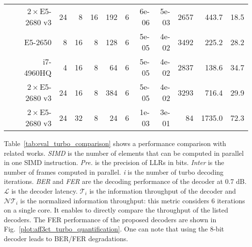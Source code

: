 \begin{table}[htp]
{{\begin{tabular}{r r r r r r r r r r r r}
  \cite{Cassagne2016a}              & $2\times$E5-2680 v3 & 24             &  8            & 16           & 192             & 6        & 6e-06        & 5e-03            &                 2657  &                 443.7  &   18.5                \\
  \cite{Cassagne2016a}              & E5-2650             & 8              & 16            &  8           & 128             & 6        & 5e-05        & 4e-02            &                 3492  &                 225.2  &   28.2                \\
  \cite{Cassagne2016a}              & i7-4960HQ           & 4              & 16            &  8           & 64              & 6        & 5e-05        & 4e-02            &                 2837  &                 138.6  &   34.7                \\
  \cite{Cassagne2016a}              & $2\times$E5-2680 v3 & 24             & 16            &  8           & 384             & 6        & 5e-05        & 4e-02            &                 3293  &                 716.4  &   29.9                \\
  \cite{LeGal2019a}                 & $2\times$E5-2680 v3 & 24             & 32            &  8           & 24              & 6        & 1e-03        & 3e-01            &                   84  &                1735.0  &   72.3                \\
  \end{tabular}
  }}
\end{table}

Table~\ref{tab:eval_turbo_comparison} shows a performance comparison with
related works. \emph{SIMD} is the number of elements that can be computed in
parallel in one SIMD instruction. \emph{Pre.} is the precision of LLRs in bits.
\emph{Inter} is the number of frames computed in parallel. \emph{i} is the
number of turbo decoding iterations. \emph{BER} and \emph{FER} are the decoding
performance of the decoder at 0.7 dB. $\mathcal{L}$ is the decoder latency.
$\mathcal{T}_i$ is the information throughput of the decoder and
$\mathcal{NT}_i$ is the normalized information throughput: this metric considers
6 iterations on a single core. It enables to directly compare the throughput of
the listed decoders. The FER performance of the proposed decoders are shown in
Fig.~\ref{plot:aff3ct_turbo_quantification}. One can note that using the 8-bit
decoder leads to BER/FER degradations.

